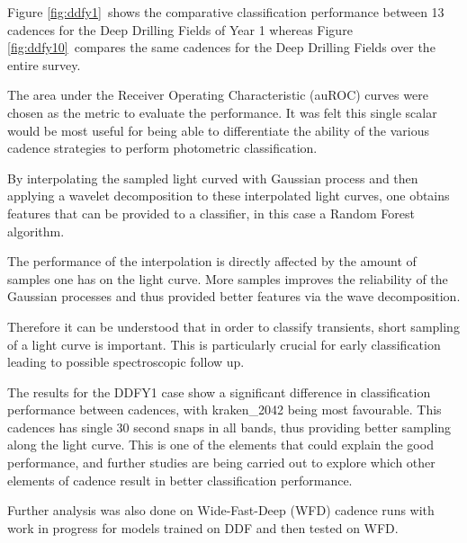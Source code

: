 Figure \ref{fig:ddfy1}~shows the comparative classification performance between 13 cadences for the Deep
Drilling Fields of Year 1 whereas Figure \ref{fig:ddfy10}~compares the same
cadences for the Deep Drilling Fields over the entire survey.

The area under the Receiver Operating Characteristic (auROC) curves were chosen as the metric
to evaluate the performance. It was felt this single scalar would be most useful
for being able to differentiate the ability of the various cadence strategies
to perform photometric classification.



By interpolating the sampled light curved with Gaussian process and then applying a
wavelet decomposition to these interpolated light curves, one obtains features
that can be provided to a classifier, in this case a Random Forest algorithm.

 The performance of the interpolation is directly affected by the amount of samples one has on the light curve. More samples improves the reliability of the Gaussian processes and thus provided better features via the wave decomposition.

 Therefore it can be understood that in order to classify transients, short sampling of a light curve is important. This is particularly crucial for early classification leading to possible spectroscopic follow up.

 The results for the DDFY1 case show a significant difference in classification performance between cadences, with kraken\_2042 being most favourable. This cadences has single 30 second snaps in all bands, thus providing better sampling along the light curve. This is one of the elements that could explain the good performance, and further studies are being carried out to explore which other elements of cadence result in better classification performance.

 Further analysis was also done on Wide-Fast-Deep (WFD) cadence runs with work in progress for models trained on DDF and then tested on WFD.


